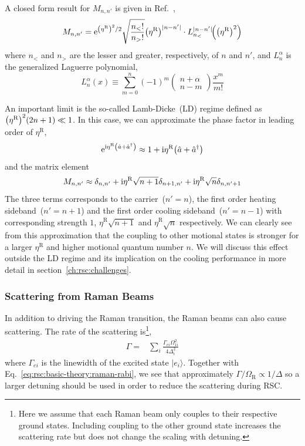 A closed form result for $M_{n,n'}$ is given in Ref.~\cite{wineland_experimental_1998},
\[ M_{n,n'}=\mathrm{e}^{{\left({\eta^{\mathrm{R}}}\right)}^2/2}\sqrt{\frac{n_<!}{n_>!}}{\left({\eta^{\mathrm{R}}}\right)}^{|n-n'|}\cdot L_{n_<}^{|n-n'|}\!{\left({{\left({\eta^{\mathrm{R}}}\right)}^2}\right)} \]
where $n_<$ and $n_>$ are the lesser and greater, respectively, of $n$ and $n'$,
and $L_n^\alpha$ is the generalized Laguerre polynomial,
\[ L_n^\alpha(x)\equiv\sum_{m=0}^n(-1)^m\begin{pmatrix}n+\alpha\\n-m\end{pmatrix}\frac{x^m}{m!} \]

An important limit is the so-called Lamb-Dicke~(LD) regime defined
as ${\left({\eta^{\mathrm{R}}}\right)}^2(2n+1)\ll 1$.
In this case, we can approximate the phase factor in leading order of $\eta^{\mathrm{R}}$,
\[ \mathrm{e}^{\mathrm{i}\eta^{\mathrm{R}}{\left({\hat a+\hat a^\dagger}\right)}}\approx1+\mathrm{i}\eta^{\mathrm{R}}{\left({\hat a+\hat a^\dagger}\right)} \]
and the matrix element
\[ M_{n,n'}\approx\delta_{n,n'}+\mathrm{i}\eta^{\mathrm{R}}\sqrt{n+1}\delta_{n+1,n'}+\mathrm{i}\eta^{\mathrm{R}}\sqrt{n}\delta_{n,n'+1} \]
The three terms corresponds to the carrier~($n'=n$),
the first order heating sideband~($n'=n+1$)
and the first order cooling sideband~($n'=n-1$) with corresponding strength
$1$, $\eta^{\mathrm{R}}\sqrt{n+1}$ and $\eta^{\mathrm{R}}\sqrt{n}$ respectively.
We can clearly see from this approximation that the coupling to other motional states
is stronger for a larger $\eta^{\mathrm{R}}$ and higher motional quantum number $n$.
We will discuss this effect outside the LD regime and its implication
on the cooling performance in more detail in section~\ref{ch:rsc:challenges}.

\subsubsection{Scattering from Raman Beams}
\label{ch:rsc:basic-theory:raman-scatter}

In addition to driving the Raman transition, the Raman beams can also cause scattering.
The rate of the scattering is\footnote{
  Here we assume that each Raman beam only couples to their respective ground states.
  Including coupling to the other ground state increases the scattering rate but does not change
  the scaling with detuning.},
\begin{align*}
  \Gamma=&\sum_{i}\frac{\Gamma_{ei}\Omega_{1i}^2}{4\Delta_i^2}
\end{align*}
where $\Gamma_{ei}$ is the linewidth of the excited state $|e_i\rangle$.
Together with Eq.~\ref{eq:rsc:basic-theory:raman-rabi}, we see that approximately
$\Gamma/\Omega_{\mathrm{R}}\propto1/\Delta$ so a larger detuning should be used
in order to reduce the scattering during RSC.

